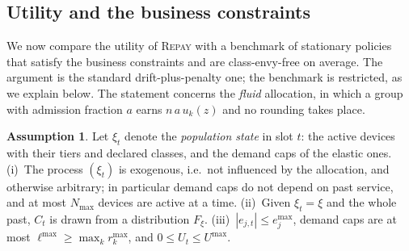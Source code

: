 \documentclass[preprint,11pt]{elsarticle}
\theoremstyle{definition}
\newtheorem{assumption}{Assumption}
\theoremstyle{remark}
\newcommand{\rmax}{r^{\max}}
\newcommand{\repay}{\textsc{Repay}}
\begin{document}
\subsection{Utility and the business constraints}\label{sec:opt}

We now compare the utility of \repay{} with a benchmark of stationary policies that satisfy the business constraints and are class-envy-free on average. The argument is the standard drift-plus-penalty one; the benchmark is restricted, as we explain below.
The statement concerns the \emph{fluid} allocation, in which a group with admission fraction $a$ earns $n\,a\,u_k(z)$ and no rounding takes place.

\begin{assumption}\label{ass:model}
Let $\xi_t$ denote the \emph{population state} in slot $t$: the active devices with their tiers and declared classes, and the demand caps of the elastic ones.
(i)~The process $(\xi_t)$ is exogenous, i.e.\ not influenced by the allocation, and otherwise arbitrary; in particular demand caps do not depend on past service, and at most $N_{\max}$ devices are active at a time.
(ii)~Given $\xi_t=\xi$ and the whole past, $C_t$ is drawn from a distribution $F_\xi$.
(iii)~$|e_{j,t}|\le e_j^{\max}$, demand caps are at most $\ell^{\max}\ge\max_k\rmax_k$, and $0\le U_t\le U^{\max}$.
\end{assumption}
\end{document}
